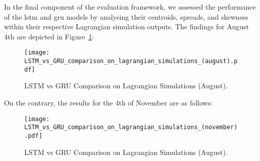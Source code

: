 In the final component of the evaluation framework, we assessed the performance of the \acrshort{lstm} and \acrshort{gru} models by analysing their centroids, spreads, and skewness within their respective Lagrangian simulation outputs. The findings for August 4th are depicted in Figure~\ref{fig_4.6}:

\begin{figure}[htbp]
    \centering
    \texttt{[image: LSTM\_vs\_GRU\_comparison\_on\_lagrangian\_simulations\_(august).pdf]}
    \caption[Short sample caption.]{LSTM vs GRU Comparison on Lagrangian Simulations (August).\label{fig_4.6}}
\end{figure}
On the contrary, the results for the 4th of November are as follows:

\begin{figure}[htbp]
    \centering
    \texttt{[image: LSTM\_vs\_GRU\_comparison\_on\_lagrangian\_simulations\_(november).pdf]}
    \caption[Short sample caption.]{LSTM vs GRU Comparison on Lagrangian Simulations (August).\label{fig_4.7}}
\end{figure}